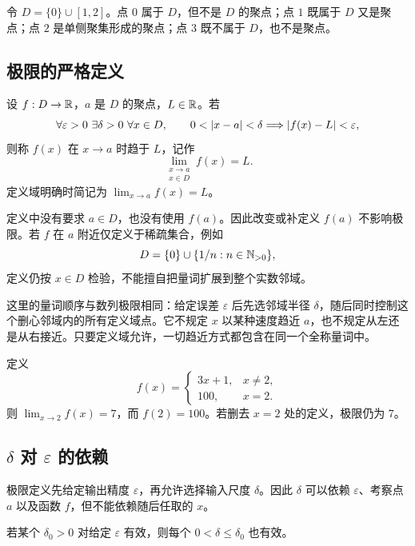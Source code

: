 \begin{example}
令 \(D=\{0\}\cup[1,2]\)。点 \(0\) 属于 \(D\)，但不是 \(D\) 的聚点；点 \(1\) 既属于 \(D\) 又是聚点；点 \(2\) 是单侧聚集形成的聚点；点 \(3\) 既不属于 \(D\)，也不是聚点。
\end{example}

\subsection{极限的严格定义}

\begin{definition}[函数极限]
设 \(f:D\to\mathbb{R}\)，\(a\) 是 \(D\) 的聚点，\(L\in\mathbb{R}\)。若
\[
 \forall\varepsilon>0\ \exists\delta>0\ \forall x\in D,\qquad
 0<\abs{x-a}<\delta\Longrightarrow\abs{f(x)-L}<\varepsilon,
\]
则称 \(f(x)\) 在 \(x\to a\) 时趋于 \(L\)，记作
\[
 \lim_{\substack{x\to a\\x\in D}}f(x)=L.
\]
定义域明确时简记为 \(\lim_{x\to a}f(x)=L\)。
\end{definition}

定义中没有要求 \(a\in D\)，也没有使用 \(f(a)\)。因此改变或补定义 \(f(a)\) 不影响极限。若 \(f\) 在 \(a\) 附近仅定义于稀疏集合，例如
\[
 D=\{0\}\cup\{1/n:n\in\mathbb{N}_{>0}\},
\]
定义仍按 \(x\in D\) 检验，不能擅自把量词扩展到整个实数邻域。

这里的量词顺序与数列极限相同：给定误差 \(\varepsilon\) 后先选邻域半径 \(\delta\)，随后同时控制这个删心邻域内的所有定义域点。它不规定 \(x\) 以某种速度趋近 \(a\)，也不规定从左还是从右接近。只要定义域允许，一切趋近方式都包含在同一个全称量词中。

\begin{example}[点值与极限相互独立]
定义
\[
 f(x)=
 \begin{cases}
 3x+1,&x\ne2,\\
 100,&x=2.
 \end{cases}
\]
则 \(\lim_{x\to2}f(x)=7\)，而 \(f(2)=100\)。若删去 \(x=2\) 处的定义，极限仍为 \(7\)。
\end{example}

\subsection{\texorpdfstring{\(\delta\)}{delta} 对 \texorpdfstring{\(\varepsilon\)}{epsilon} 的依赖}

极限定义先给定输出精度 \(\varepsilon\)，再允许选择输入尺度 \(\delta\)。因此 \(\delta\) 可以依赖 \(\varepsilon\)、考察点 \(a\) 以及函数 \(f\)，但不能依赖随后任取的 \(x\)。

\begin{proposition}[缩小半径]
若某个 \(\delta_0>0\) 对给定 \(\varepsilon\) 有效，则每个 \(0<\delta\le\delta_0\) 也有效。
\end{proposition}


